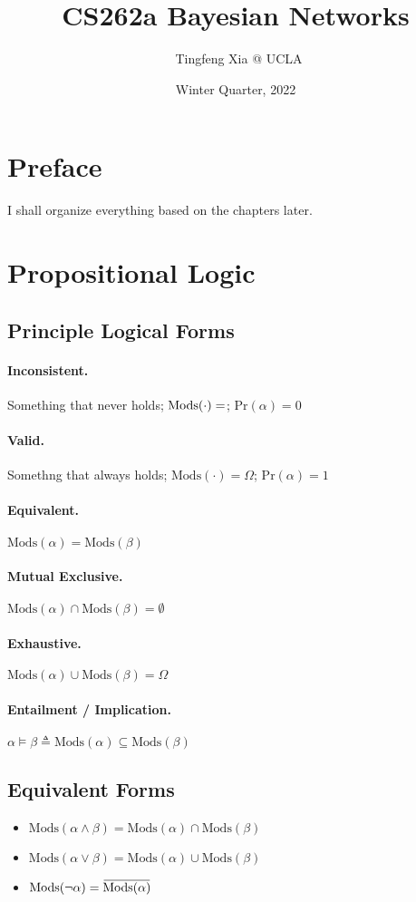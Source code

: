 \documentclass[11pt]{article}
\author{\ccLogo\, Tingfeng Xia @ UCLA}
\title{CS262a Bayesian Networks}
\date{Winter Quarter, 2022}
\newcommand{\overbar}[1]{\mkern 1.5mu\overline{\mkern-1.5mu#1\mkern-1.5mu}\mkern 1.5mu}
\newcommand{\mods}{\mathrm{Mods}}
\newcommand{\pr}{\mathrm{Pr}}
\begin{document}
\maketitle
\doclicenseThis

\section*{Preface}
I shall organize everything based on the chapters later. 

\section{Propositional Logic}
\subsection{Principle Logical Forms}
\paragraph{Inconsistent.} Something that never holds; $\mods (\cdot) = \empty$; $\pr(\alpha) = 0$
\paragraph{Valid.} Somethng that always holds; $\mods (\cdot) = \Omega$; $\pr (\alpha) = 1$
\paragraph{Equivalent.} $\mods (\alpha) = \mods (\beta)$
\paragraph{Mutual Exclusive.} $\mods(\alpha) \cap \mods (\beta) = \emptyset$
\paragraph{Exhaustive.} $\mods (\alpha) \cup \mods (\beta) = \Omega$
\paragraph{Entailment / Implication.} $\alpha \vDash \beta \triangleq \mods (\alpha) \subseteq \mods ( \beta)$

\subsection{Equivalent Forms}
\begin{itemize}
\item $\mods( \alpha \land \beta) = \mods( \alpha) \cap \mods(\beta)$
\item $\mods( \alpha \vee \beta) = \mods ( \alpha) \cup \mods ( \beta)$
\item $\mods ( \neg \alpha) = \overbar{\mods ( \alpha)}$
\end{itemize}
\end{document}
